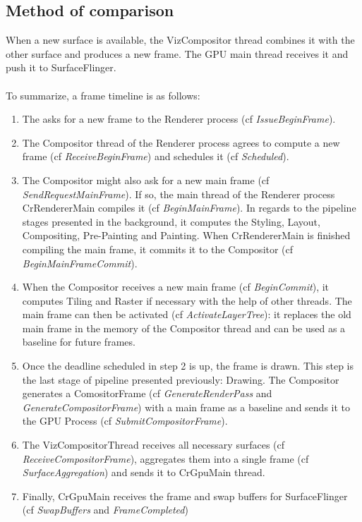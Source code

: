     \subsection{Method of comparison}
    
    \iffalse
    When a new surface is available, the VizCompositor thread combines it with the other surface and produces a new frame. The GPU main thread receives it and push it to SurfaceFlinger.
\paragraph{}
To summarize, a frame timeline is as follows:
\begin{enumerate}
    \item The  asks for a new frame to the Renderer process (cf \textit{IssueBeginFrame}).
    \item The Compositor thread of the Renderer process agrees to compute a new frame (cf \textit{ReceiveBeginFrame}) and schedules it (cf \textit{Scheduled}).
    \item The Compositor might also ask for a new main frame (cf \textit{SendRequestMainFrame}). If so, the main thread of the Renderer process CrRendererMain compiles it (cf \textit{BeginMainFrame}). In regards to the pipeline stages presented in the background, it computes the Styling, Layout, Compositing, Pre-Painting and Painting. When CrRendererMain is finished compiling the main frame, it commits it to the Compositor (cf \textit{BeginMainFrameCommit}).
    \item When the Compositor receives a new main frame (cf \textit{BeginCommit}), it computes Tiling and Raster if necessary with the help of other threads. The main frame can then be activated (cf \textit{ActivateLayerTree}): it replaces the old main frame in the memory of the Compositor thread and can be used as a baseline for future frames.
    \item Once the deadline scheduled in step 2 is up, the frame is drawn. This step is the last stage of pipeline presented previously: Drawing. The Compositor generates a ComositorFrame (cf \textit{GenerateRenderPass} and \textit{GenerateCompositorFrame}) with a main frame as a baseline and sends it to the GPU Process (cf \textit{SubmitCompositorFrame}).
    \item The VizCompositorThread receives all necessary surfaces (cf \textit{ReceiveCompositorFrame}), aggregates them into a single frame (cf \textit{SurfaceAggregation}) and sends it to CrGpuMain thread.
    \item Finally, CrGpuMain receives the frame and swap buffers for SurfaceFlinger (cf \textit{SwapBuffers} and \textit{FrameCompleted})
\end{enumerate}


